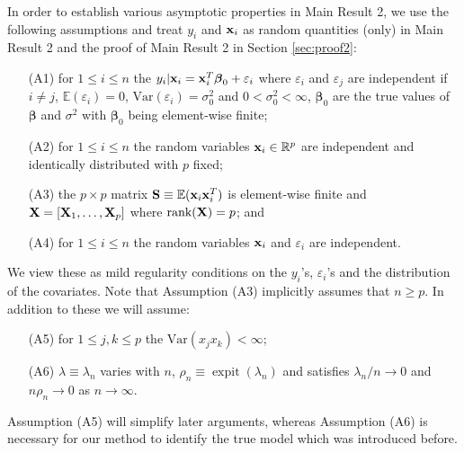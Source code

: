 \documentclass[11pt]{article}
\newtheorem{Main Result}{Main Result}
\def\vectorfontone{\bf}
\def\vectorfonttwo{\boldsymbol}
\def\vx{{\vectorfontone x}}                      %
\def\vbeta{{\vectorfonttwo \beta}}               %
\def\matrixfontone{\bf}
\def\mS{{\matrixfontone S}}                      %
\def\mX{{\matrixfontone X}}                      %
\def\bE{{\mathbb E}}                             %
\def\bR{{\mathbb R}}                             %
\def\Var{\mbox{Var}}
\DeclareMathOperator{\expit}{expit}
\newcommand{\cyc}[1]{{\color{black}#1}}
\begin{document}
\medskip
\noindent
In order to establish various asymptotic properties in Main Result 2, we use the following
assumptions \cite[which are similar to those used in][]{You2014} and treat $y_i$ and $\vx_i$ as random quantities (only) in Main Result 2 and the proof of Main Result 2 in Section \ref{sec:proof2}:
\begin{enumerate}
	\item[(A1)] for $1\le i\le n$ the $y_i|\vx_i = \vx_i^T\vbeta_0 + \varepsilon_i$ where
	$\varepsilon_i$ and $\varepsilon_j$ are independent if $i\neq j$, $\bE(\varepsilon_i)=0$, $\Var(\varepsilon_i)=\sigma_0^2$ and $0<\sigma_0^2<\infty$, $\vbeta_0$ are the true
	values of $\vbeta$ and $\sigma^2$ with $\vbeta_0$ being element-wise finite;
	
	\item [(A2)] for $1\le i\le n$ the random variables $\vx_i\in\bR^p$ are
	independent and identically distributed with $p$ fixed;
	
	\item [(A3)] the $p\times p$ matrix $\mS\equiv\bE(\vx_i\vx_i^T)$ is element-wise
	finite and $\mX = [\mX_1,\ldots,\mX_p ]$ where $\text{rank} (\mX) = p$; and
	
	\item [(A4)] for $1\le i\le n$ the random variables $\vx_i$ and
	$\varepsilon_i$ are independent.
\end{enumerate}

\noindent We view these as mild regularity conditions on the $y_i$'s,
$\varepsilon_i$'s and the distribution of the covariates. Note that
Assumption (A3) implicitly assumes that $n\ge p$.
In addition to these we will assume:
\begin{enumerate}
	\item[(A5)] for $1\le j,k \le p$ the $\mbox{Var}(x_j x_k)<\infty$;
	
	
	\item[\cyc{(A6})] $\lambda\equiv \lambda_n$ varies with $n$,
	$\rho_n\equiv \expit(\lambda_n)$ and satisfies $\lambda_n/n\to 0$ and
	$n\rho_n \to 0$ as $n\to\infty$.
\end{enumerate}

\noindent Assumption (A5) will simplify later arguments, whereas Assumption
(A6) is necessary for our method to identify the true model which was introduced before.
\end{document}
